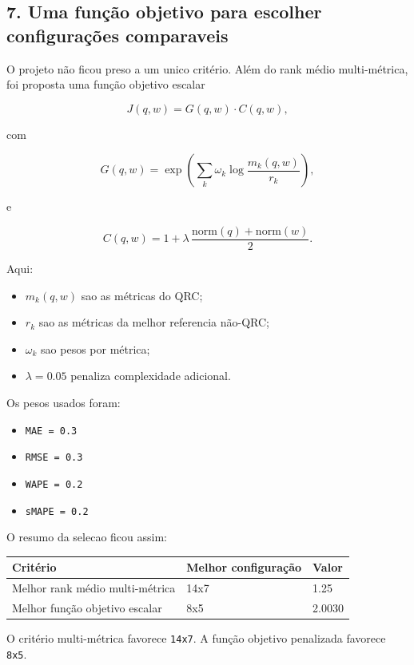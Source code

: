 \documentclass[12pt]{article}
\providecommand{\tightlist}{%
  \setlength{\itemsep}{0pt}\setlength{\parskip}{0pt}}
\begin{document}
\subsection{7. Uma função objetivo para escolher configurações comparaveis}\label{7-uma-funuxe7uxe3o-objetivo-para-escolher-configurauxe7uxf5es-comparaveis}

O projeto não ficou preso a um unico critério. Além do rank médio multi-métrica, foi proposta uma função objetivo escalar

\[
J(q, w) = G(q, w) \cdot C(q, w),
\]

com

\[
G(q, w) = \exp\left(\sum_k \omega_k \log\frac{m_k(q, w)}{r_k}\right),
\]

e

\[
C(q, w) = 1 + \lambda \, \frac{\mathrm{norm}(q) + \mathrm{norm}(w)}{2}.
\]

Aqui:

\begin{itemize}
\tightlist
\item
  \(m_k(q, w)\) sao as métricas do QRC;
\item
  \(r_k\) sao as métricas da melhor referencia não-QRC;
\item
  \(\omega_k\) sao pesos por métrica;
\item
  \(\lambda = 0.05\) penaliza complexidade adicional.
\end{itemize}

Os pesos usados foram:

\begin{itemize}
\tightlist
\item
  \texttt{MAE\ =\ 0.3}
\item
  \texttt{RMSE\ =\ 0.3}
\item
  \texttt{WAPE\ =\ 0.2}
\item
  \texttt{sMAPE\ =\ 0.2}
\end{itemize}

O resumo da selecao ficou assim:

\begin{longtable}[]{@{}lll@{}}
\toprule\noalign{}
Critério & Melhor configuração & Valor \\
\midrule\noalign{}
\endhead
\bottomrule\noalign{}
\endlastfoot
Melhor rank médio multi-métrica & 14x7 & 1.25 \\
Melhor função objetivo escalar & 8x5 & 2.0030 \\
\end{longtable}

O critério multi-métrica favorece \texttt{14x7}. A função objetivo penalizada favorece \texttt{8x5}.
\end{document}

